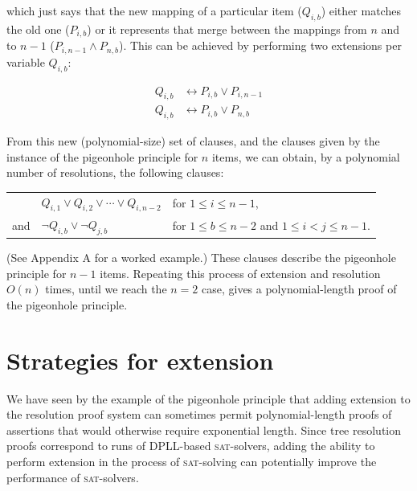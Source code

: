 \documentclass[proof,pdftex,11pt,a4,titlepage]{article}
\newcommand{\sat}{\textsc{sat}}
\begin{document}
which just says that the new mapping of a particular item ($Q_{i,b}$) either matches the old one ($P_{i,b}$) or it represents that merge between the mappings from $n$ and to $n-1$ ($P_{i,n-1} \wedge P_{n,b}$). This can be achieved by performing two extensions per variable $Q_{i,b}$:

\begin{equation*}
  \begin{align*}
    Q_{i,b} &\leftrightarrow P_{i,b} \vee P_{i,n-1} \\
    Q_{i,b} &\leftrightarrow P_{i,b} \vee P_{n,b}
  \end{align*}
\end{equation*}

From this new (polynomial-size) set of clauses, and the clauses given by the instance of the pigeonhole principle for $n$ items, we can obtain, by a polynomial number of resolutions, the following clauses:

\begin{table}[h]
  \begin{tabular}{rll}
        & $Q_{i,1} \vee Q_{i,2} \vee \cdots \vee Q_{i,n-2}$ & for $1 \leq i \leq n-1$, \\
    and & $\neg Q_{i,b} \vee \neg Q_{j,b}$ & for $1 \leq b \leq n-2$ and $1 \leq i < j \leq n-1$.
  \end{tabular}
\end{table}
\FloatBarrier

(See Appendix A for a worked example.) These clauses describe the pigeonhole principle for $n-1$ items. Repeating this process of extension and resolution $O(n)$ times, until we reach the $n=2$ case, gives a polynomial-length proof of the pigeonhole principle.

\section{Strategies for extension}

We have seen by the example of the pigeonhole principle that adding extension to the resolution proof system can sometimes permit polynomial-length proofs of assertions that would otherwise require exponential length. Since tree resolution proofs correspond to runs of DPLL-based \sat{}-solvers, adding the ability to perform extension in the process of \sat{}-solving can potentially improve the performance of \sat{}-solvers.
\end{document}
